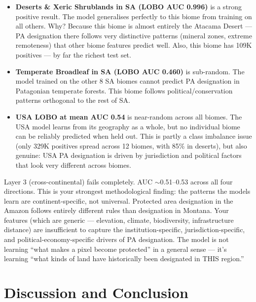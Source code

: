 \documentclass[12pt]{article}
\theoremstyle{break} %
\begin{document}
\begin{itemize}
    \item \textbf{Deserts \& Xeric Shrublands in SA (LOBO AUC 0.996)} is a strong positive result. The model generalises perfectly to this biome from training on all others. Why? Because this biome is almost entirely the Atacama Desert --- PA designation there follows very distinctive patterns (mineral zones, extreme remoteness) that other biome features predict well. Also, this biome has 109K positives --- by far the richest test set.
    
    \item \textbf{Temperate Broadleaf in SA (LOBO AUC 0.460)} is sub-random. The model trained on the other 8 SA biomes cannot predict PA designation in Patagonian temperate forests. This biome follows political/conservation patterns orthogonal to the rest of SA.
    
    \item \textbf{USA LOBO at mean AUC 0.54} is near-random across all biomes. The USA model learns from its geography as a whole, but no individual biome can be reliably predicted when held out. This is partly a class imbalance issue (only 329K positives spread across 12 biomes, with 85\% in deserts), but also genuine: USA PA designation is driven by jurisdiction and political factors that look very different across biomes.
\end{itemize}

\vspace{1em}

Layer 3 (cross-continental) fails completely. AUC $\sim$0.51--0.53 across all four directions. This is your strongest methodological finding: the patterns the models learn are continent-specific, not universal. Protected area designation in the Amazon follows entirely different rules than designation in Montana. Your features (which are generic --- elevation, climate, biodiversity, infrastructure distance) are insufficient to capture the institution-specific, jurisdiction-specific, and political-economy-specific drivers of PA designation. The model is not learning ``what makes a pixel become protected'' in a general sense --- it's learning ``what kinds of land have historically been designated in THIS region.''

\section{Discussion and Conclusion}
\label{discussion}
\end{document}
